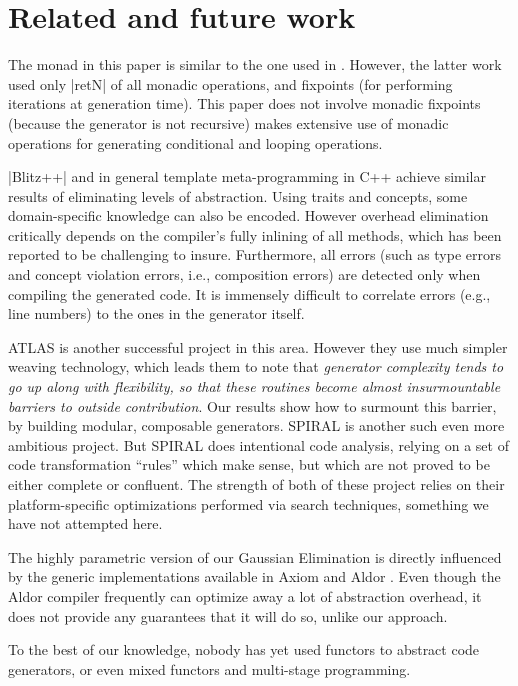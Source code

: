 \documentclass{llncs}
\begin{document}
\section{Related and future work}\label{related}

The monad in this paper is similar to the one used in \cite{KiselyovTaha}.
However, the latter work used only |retN| of all monadic operations,
and fixpoints (for performing iterations at generation time).
This paper does not involve monadic fixpoints (because the generator
is not recursive) makes extensive use of monadic operations for
generating conditional and looping operations.

|Blitz++| \cite{Veldhuizen:1998:ISCOPE} and in general template
meta-programming in C++ achieve similar results of eliminating levels
of abstraction.  Using traits and concepts, some domain-specific
knowledge can also be encoded.  However overhead elimination
critically depends on the compiler's fully inlining of all methods,
which has been reported to be challenging to insure. Furthermore, all
errors (such as type errors and concept violation errors, i.e.,
composition errors) are detected only when compiling the generated
code. It is immensely difficult to correlate errors (e.g., line
numbers) to the ones in the generator itself.

ATLAS \cite{ATLAS} is another successful project in this area.  However
they use much simpler weaving technology, which leads them to note
that \emph{generator complexity tends to go up along with flexibility, 
so that these routines become almost insurmountable barriers to 
outside contribution}.  Our results show how to surmount this barrier,
by building modular, composable generators.
SPIRAL \cite{Pueschel:05} is another such even more ambitious project.
But SPIRAL does intentional code analysis, relying on a set of code
transformation ``rules'' which make sense, but which are not proved 
to be either complete or confluent.  The strength of both of these
project relies on their platform-specific optimizations performed
via search techniques, something we have not attempted here.

The highly parametric version of our Gaussian Elimination is directly
influenced by the generic implementations available in Axiom
\cite{Axiom} and Aldor \cite{Watt:2002:HCA}.  Even though the Aldor
compiler frequently can optimize away a lot of abstraction overhead, 
it does not provide any guarantees that it will do so, unlike our
approach.

To the best of our knowledge, nobody has yet used functors to
abstract code generators, or even mixed functors and 
multi-stage programming.
\end{document}
